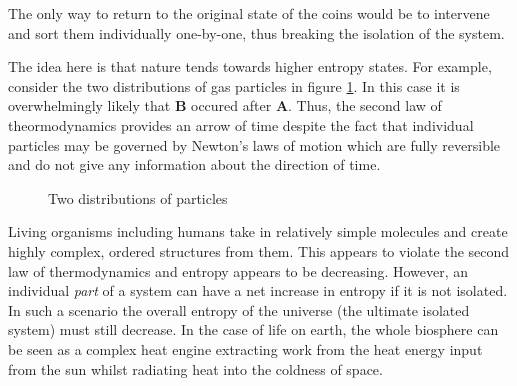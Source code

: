 \documentclass[revision-guide.tex]{subfiles}
\begin{document}
The only way to return to the original state of the coins would be to intervene and sort them individually one-by-one, thus breaking the isolation of the system.


The idea here is that nature tends towards higher entropy states. For example, consider the two distributions of gas particles in figure \ref{fig:gas-distrib}. In this case it is overwhelmingly likely that \textbf{B} occured after \textbf{A}. Thus, the second law of theormodynamics provides an arrow of time despite the fact that individual particles may be governed by Newton's laws of motion which are fully reversible and do not give any information about the direction of time.

\begin{figure}[ht]
  \begin{center}\end{center}
  \caption{Two distributions of particles}
  \label{fig:gas-distrib}
\end{figure}


Living organisms including humans take in relatively simple molecules and create highly complex, ordered structures from them. This appears to violate the second law of thermodynamics and entropy appears to be decreasing. However, an individual \emph{part} of a system can have a net increase in entropy if it is not isolated. In such a scenario the overall entropy of the universe (the ultimate isolated system) must still decrease. In the case of life on earth, the whole biosphere can be seen as a complex heat engine extracting work from the heat energy input from the sun whilst radiating heat into the coldness of space.
\end{document}
